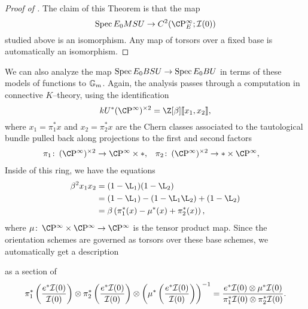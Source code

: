 \begin{proof}[Proof of ]
The claim of this Theorem is that the map \[\Spec E_0 MSU \to C^2(\CP^\infty_E; \sheaf I(0))\] studied above is an isomorphism.  Any map of torsors over a fixed base is automatically an isomorphism.
\end{proof}



\begin{remark}\label{BSUToBU}
We can also analyze the map $\operatorname{Spec} E_0 BSU \to \operatorname{Spec} E_0 BU$ in terms of these models of functions to $\mathbb G_m$.  Again, the analysis passes through a computation in connective $K$--theory, using the identification \[kU^*(\CP^\infty)^{\times 2} = \Z[\beta]\ps{x_1, x_2},\] where $x_1 = \pi_1^* x$ and $x_2 = \pi_2^* x$ are the Chern classes associated to the tautological bundle pulled back along projections to the first and second factors
\begin{align*}
\pi_1\co (\CP^\infty)^{\times 2} & \to \CP^\infty \times *, &
\pi_2\co (\CP^\infty)^{\times 2} & \to * \times \CP^\infty,
\end{align*}
Inside of this ring, we have the equations
\begin{align*}
\beta^2 x_1 x_2 & = (1 - \L_1)(1 - \L_2) \\
& = (1 - \L_1) - (1 - \L_1 \L_2) + (1 - \L_2) \\
& = \beta\left(\pi_1^*(x) - \mu^*(x) + \pi_2^*(x) \right),
\end{align*}
where $\mu\co \CP^\infty \times \CP^\infty \to \CP^\infty$ is the tensor product map.  Since the orientation schemes are governed as torsors over these base schemes, we automatically get a description
\begin{center}
\end{center}
as a section of
\[\pi_1^* \left(\frac{e^* \mathcal{I}(0)}{\mathcal{I}(0)}\right) \otimes \pi_2^* \left(\frac{e^* \mathcal{I}(0)}{\mathcal{I}(0)}\right) \otimes \left(\mu^* \left(\frac{e^* \mathcal{I}(0)}{\mathcal{I}(0)}\right) \right)^{-1} = \frac{e^* \mathcal{I}(0) \otimes \mu^* \mathcal{I}(0)}{\pi_1^* \mathcal{I}(0) \otimes \pi_2^* \mathcal{I}(0)}.\]
\end{remark}

